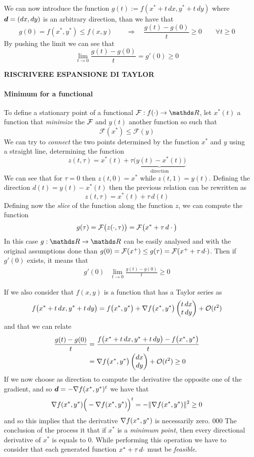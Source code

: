 	We can now introduce the function $g(t) := f(x^* + t\, dx, y^* + t\, dy)$ where $\boldsymbol{d} = (dx,dy)$ is an arbitrary direction, than we have that
	\[ g(0) = f(x^*,y^*)\leq f(x,y) \qquad \Rightarrow \quad \frac{g(t)-g(0)}{t} \geq 0 \qquad \forall t\geq 0\]
	By pushing the limit we can see that
	\[ \lim_{t\rightarrow 0}\frac{g(t)-g(0)}{t} = g'(0) \geq 0 \]
	
	\textbf{RISCRIVERE ESPANSIONE DI TAYLOR}
	
	\paragraph{Minimum for a functional} To define a stationary point of a functional $\fun F: f(\cdot)\rightarrow \R$, let $x^*(t)$ a function that \textit{minimize} the $\mathcal{F}$ and $y(t)$ another function so such that
	\[ \mathcal F(x^*) \leq \mathcal F(y) \]
	We can try to \textit{connect} the two points determined by the function $x^*$ and $y$ using a straight line, determining the function
	\[ z(t,\tau) = x^*(t) + \tau\underbrace{\big(y(t)-x^*(t)\big)}_{\textrm{direction}} \]
	We can see that for $\tau = 0$ then $z(t,0)=x^*$ while $z(t,1) = y(t)$. Defining the direction $d(t) = y(t)-x^*(t)$ then the previous relation can be rewritten as
	\[ z(t,\tau) = x^*(t) + \tau \, d(t) \]
	Defining now the \textit{slice} of the function along the function $z$, we can compute the function
	\[ g(\tau) = \mathcal{F}\big(z(\cdot,\tau)\big) = \mathcal{F}\big(x^* + \tau \, d\cdot\big) \]
	In this case $g:\R\rightarrow \R$ can be easily analysed and with the original assumptions done than $g(0) = \mathcal F(x^+) \leq g(\tau) = \mathcal{F}(x^++ \tau \, d\cdot)$. Then if $g'(0)$ exists, it means that
	\begin{align*}
		g'(0) & \lim_{t\rightarrow 0} \frac{g(t)-g(0)}{t} \geq 0
	\end{align*}

	If we also consider that $f(x,y)$ is a function that has a Taylor series as
	\[ f\big(x^* + t\, dx,y^*+t\, dy\big) = f\big(x^*,y^*\big) + \nabla f\big(x^*,y^*\big) \begin{pmatrix} t\, dx \\ t \, dy \end{pmatrix} + \mathcal O(t^2) \]
	and that we can relate
	\begin{align*}
		\frac{g(t)-g(0)}{t} & = \frac{f\big(x^* + t\, dx,y^*+t\, dy\big) - f\big(x^*,y^*\big)}{t} \\& = \nabla f\big(x^*,y^*\big) \begin{pmatrix} dx \\ dy \end{pmatrix} + \mathcal O(t^2) \geq 0
	\end{align*}
	If we now choose as direction to compute the derivative the opposite one of the gradient, and so $\boldsymbol{d} = - \nabla f(x^*,y^*)^t$ we have that
	\[ \nabla f(x^*,y^*) \Big(-\nabla f(x^*,y^*)\Big)^t = - \|\nabla f(x^*,y^*)\|^2 \geq 0 \]
	and so this implies that the derivative $\nabla f(x^*,y^*)$ is necessarily zero.
	000
	The conclusion of the process it that if $x^*$ is a \textit{minimum point}, then every directional derivative of $x^*$ is equals to 0. While performing this operation we have to consider that each  generated function $x^*+\tau\, d\cdot$ must be \textit{feasible}.
	
